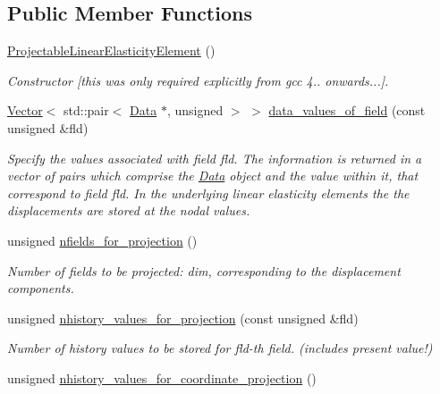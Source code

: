 \subsection*{Public Member Functions}
\begin{DoxyCompactItemize}
\item 
\hyperlink{classoomph_1_1ProjectableLinearElasticityElement_ad1e0ae5180930c9c1b52855b89a5e1a2}{Projectable\+Linear\+Elasticity\+Element} ()
\begin{DoxyCompactList}\small\item\em Constructor \mbox{[}this was only required explicitly from gcc 4.. onwards...\mbox{]}. \end{DoxyCompactList}\item 
\hyperlink{classoomph_1_1Vector}{Vector}$<$ std\+::pair$<$ \hyperlink{classoomph_1_1Data}{Data} $\ast$, unsigned $>$ $>$ \hyperlink{classoomph_1_1ProjectableLinearElasticityElement_ab73155dc46dafbc35a71a36c855f5790}{data\+\_\+values\+\_\+of\+\_\+field} (const unsigned \&fld)
\begin{DoxyCompactList}\small\item\em Specify the values associated with field fld. The information is returned in a vector of pairs which comprise the \hyperlink{classoomph_1_1Data}{Data} object and the value within it, that correspond to field fld. In the underlying linear elasticity elements the the displacements are stored at the nodal values. \end{DoxyCompactList}\item 
unsigned \hyperlink{classoomph_1_1ProjectableLinearElasticityElement_aefdb5cd9080bec31457d79ce3a888625}{nfields\+\_\+for\+\_\+projection} ()
\begin{DoxyCompactList}\small\item\em Number of fields to be projected\+: dim, corresponding to the displacement components. \end{DoxyCompactList}\item 
unsigned \hyperlink{classoomph_1_1ProjectableLinearElasticityElement_a978036eab9ff96a4af083c9963f2f369}{nhistory\+\_\+values\+\_\+for\+\_\+projection} (const unsigned \&fld)
\begin{DoxyCompactList}\small\item\em Number of history values to be stored for fld-\/th field. (includes present value!) \end{DoxyCompactList}\item 
unsigned \hyperlink{classoomph_1_1ProjectableLinearElasticityElement_af147f2ea0fb696ae5e32b21c7b877dfb}{nhistory\+\_\+values\+\_\+for\+\_\+coordinate\+\_\+projection} ()

\end{DoxyCompactItemize}

